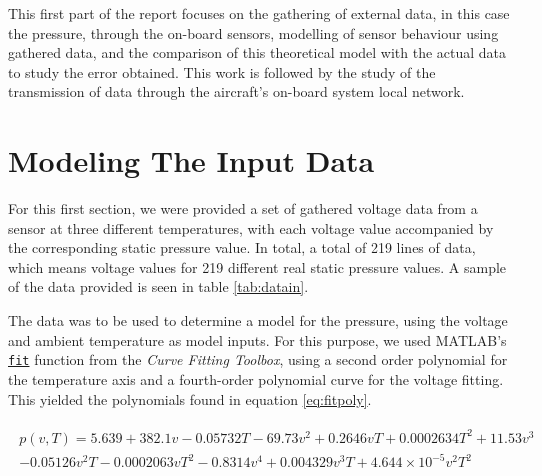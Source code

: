 \documentclass[english,palatino]{ist-report}
\begin{document}
This first part of the report focuses on the gathering of external data, in this case the pressure, through the on-board sensors, modelling of sensor behaviour using gathered data, and the comparison of this theoretical model with the actual data to study the error obtained. This work is followed by the study of the transmission of data through the aircraft's on-board system local network.

\section{Modeling The Input Data}

For this first section, we were provided a set of gathered voltage data from a sensor at three different temperatures, with each voltage value accompanied by the corresponding static pressure value. In total, a total of 219 lines of data, which means voltage values for 219 different real static pressure values. A sample of the data provided is seen in table \ref{tab:datain}.

\begin{table}[ht]
	\centering
	\caption{Example of the provided data formatting.}
	\label{tab:datain}
\end{table}

The data was to be used to determine a model for the pressure, using the voltage and ambient temperature as model inputs. For this purpose, we used MATLAB's \href{https://www.mathworks.com/help/curvefit/fit.html}{\texttt{fit}} function from the \textit{Curve Fitting Toolbox}, using a second order polynomial for the temperature axis and a fourth-order polynomial curve for the voltage fitting. This yielded the polynomials found in equation \ref{eq:fitpoly}.

\begin{gather}\label{eq:fitpoly}
	\begin{split}
		p(v,T) = 5.639 + 382.1v - 0.05732T - 69.73v^2 + 0.2646vT + 0.0002634T^2 + 11.53v^3 \\ - 0.05126v^2T - 0.0002063vT^2 - 0.8314v^4 + 0.004329v^3T + 4.644\times10^{-5}v^2T^2
	\end{split}
\end{gather}
\end{document}
